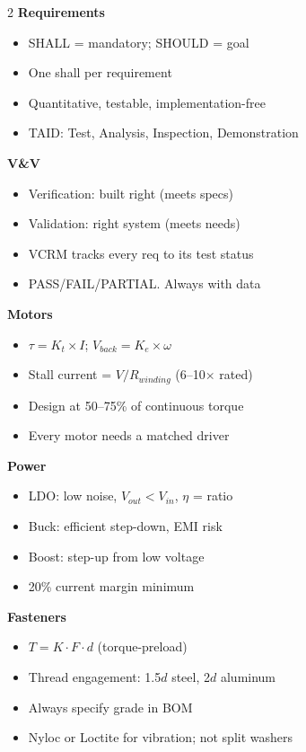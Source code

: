 \documentclass[11pt,letterpaper,twoside,openany]{book}
\begin{document}
\begin{multicols}{2}
\small
\textbf{Requirements}
\begin{itemize}[nosep,leftmargin=1em]
\item SHALL = mandatory; SHOULD = goal
\item One shall per requirement
\item Quantitative, testable, implementation-free
\item TAID: Test, Analysis, Inspection, Demonstration
\end{itemize}

\textbf{V\&V}
\begin{itemize}[nosep,leftmargin=1em]
\item Verification: built right (meets specs)
\item Validation: right system (meets needs)
\item VCRM tracks every req to its test status
\item PASS/FAIL/PARTIAL. Always with data
\end{itemize}

\textbf{Motors}
\begin{itemize}[nosep,leftmargin=1em]
\item $\tau = K_t \times I$; $V_{back} = K_e \times \omega$
\item Stall current = $V/R_{winding}$ (6--10$\times$ rated)
\item Design at 50--75\% of continuous torque
\item Every motor needs a matched driver
\end{itemize}

\textbf{Power}
\begin{itemize}[nosep,leftmargin=1em]
\item LDO: low noise, $V_{out} < V_{in}$, $\eta$ = ratio
\item Buck: efficient step-down, EMI risk
\item Boost: step-up from low voltage
\item 20\% current margin minimum
\end{itemize}

\textbf{Fasteners}
\begin{itemize}[nosep,leftmargin=1em]
\item $T = K \cdot F \cdot d$ (torque-preload)
\item Thread engagement: 1.5$d$ steel, 2$d$ aluminum
\item Always specify grade in BOM
\item Nyloc or Loctite for vibration; not split washers
\end{itemize}


\end{multicols}
\end{document}
